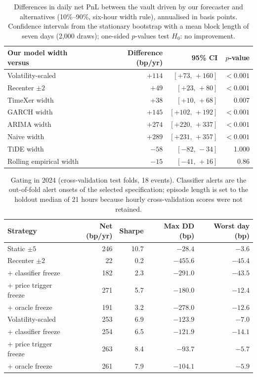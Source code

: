 \begin{table}[pos=!htbp,align=\centering]
\centering
\caption{Differences in daily net PnL between the vault driven by our forecaster and
alternatives (10\%--90\%, six-hour width rule), annualised in basis points. Confidence
intervals from the stationary bootstrap with a mean block length of seven days (2,000 draws);
one-sided $p$-values test $H_0$: no improvement.}
\label{tab:lp_bootstrap}
\begin{tabular}{lrrr}
\toprule
Our model width versus & Difference (bp/yr) & 95\% CI & $p$-value \\
\midrule
Volatility-scaled & $+114$ & $[+73,\,+160]$ & $<0.001$ \\
Recenter $\pm2$ & $+49$ & $[+23,\,+80]$ & $<0.001$ \\
TimeXer width & $+38$ & $[+10,\,+68]$ & 0.007 \\
GARCH width & $+145$ & $[+102,\,+192]$ & $<0.001$ \\
ARIMA width & $+274$ & $[+220,\,+337]$ & $<0.001$ \\
Naive width & $+289$ & $[+231,\,+357]$ & $<0.001$ \\
TiDE width & $-58$ & $[-82,\,-34]$ & 1.000 \\
Rolling empirical width & $-15$ & $[-41,\,+16]$ & 0.86 \\
\bottomrule
\end{tabular}
\end{table}

\begin{table}[pos=!htbp,align=\centering]
\centering
\caption{Gating in 2024 (cross-validation test folds, 18 events). Classifier alerts are the
out-of-fold alert onsets of the selected specification; episode length is set to the holdout
median of 21 hours because hourly cross-validation scores were not retained.}
\label{tab:lp_2024}
\small
\begin{tabular}{lrrrr}
\toprule
Strategy & Net (bp/yr) & Sharpe & Max DD (bp) & Worst day (bp) \\
\midrule
Static $\pm5$ & 246 & 10.7 & $-28.4$ & $-3.6$ \\
Recenter $\pm2$ & 22 & 0.2 & $-455.6$ & $-45.4$ \\
\quad + classifier freeze & 182 & 2.3 & $-291.0$ & $-43.5$ \\
\quad + price trigger freeze & 271 & 5.7 & $-180.0$ & $-12.4$ \\
\quad + oracle freeze & 191 & 3.2 & $-278.0$ & $-12.6$ \\
Volatility-scaled & 253 & 6.9 & $-123.9$ & $-7.0$ \\
\quad + classifier freeze & 254 & 6.5 & $-121.9$ & $-14.1$ \\
\quad + price trigger freeze & 263 & 8.4 & $-93.7$ & $-5.7$ \\
\quad + oracle freeze & 261 & 7.9 & $-104.1$ & $-5.9$ \\
\bottomrule
\end{tabular}
\end{table}

